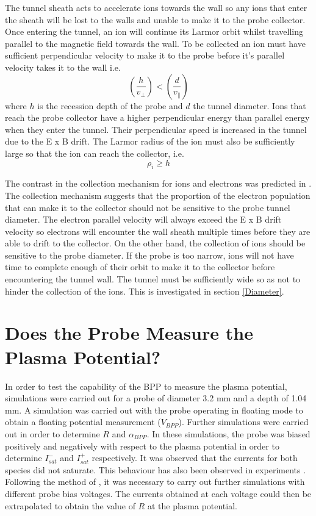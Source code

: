 The tunnel sheath acts to accelerate ions towards the wall so any ions that enter the sheath will be lost to the walls and unable to make it to the probe collector. Once entering the tunnel, an ion will continue its Larmor orbit whilst travelling parallel to the magnetic field towards the wall. To be collected  an ion must have sufficient perpendicular velocity to make it to the probe before it's parallel velocity takes it to the wall i.e. 
\begin{equation}
\left(\frac{h}{v_\perp} \right) < \left(\frac{d}{v_\parallel} \right)
\end{equation}
where $h$ is the recession depth of the probe and $d$ the tunnel diameter. Ions that reach the probe collector have a higher perpendicular energy than parallel energy when they enter the tunnel. Their perpendicular speed is increased in the tunnel due to the E x B drift. The Larmor radius of the ion must also be sufficiently large so that the ion can reach the collector, i.e.
\begin{equation}
\rho_i \geq h
\end{equation}



The contrast in the collection mechanism for ions and electrons was predicted in \cite{BPP-MAST}. The collection mechanism suggests that the proportion of the electron population that can make it to the collector should not be sensitive to the probe tunnel diameter. The electron parallel velocity will always exceed the E x B drift velocity so electrons will encounter the wall sheath multiple times before they are able to drift to the collector. On the other hand, the collection of ions should be sensitive to the probe diameter. If the probe is too narrow, ions will not have time to complete enough of their orbit to make it to the collector before encountering the tunnel wall. The tunnel must be sufficiently wide so as not to hinder the collection of the ions. This is investigated in section \ref{Diameter}. 


\section{Does the Probe Measure the Plasma Potential?} \label{Plasma_Potential}
In order to test the capability of the BPP to measure the plasma potential, simulations were carried out for a probe of diameter 3.2 mm and a depth of 1.04 mm. A simulation was carried out with the probe operating in floating mode to obtain a floating potential measurement ($V_{BPP}$). Further simulations were carried out in order to determine $R$ and $\alpha_{BPP}$. In these simulations, the probe was biased positively and negatively with respect to the plasma potential in order to determine  $I^-_{sat}$ and $I^+_{sat}$ respectively. It was observed that the currents for both species did not saturate. This behaviour has also been observed in experiments \cite{adamekfast}. Following the method of \cite{adamekfast}, it was necessary to carry out further simulations with different probe bias voltages. The currents obtained at each voltage could then be extrapolated to obtain the value of $R$ at the plasma potential. 


